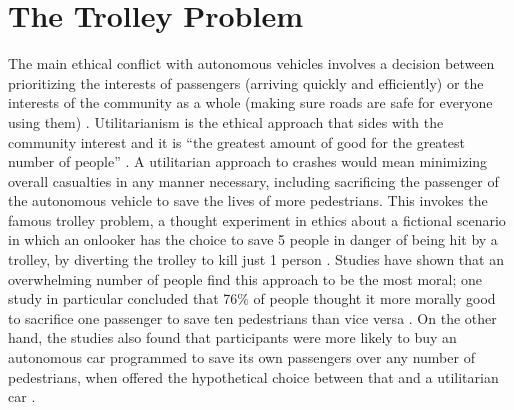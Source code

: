 \documentclass[10pt,twocolumn]{article}
\begin{document}
\section{The Trolley Problem}
The main ethical conflict with autonomous vehicles involves a decision between prioritizing the interests of passengers (arriving quickly and efficiently) or the interests of the community as a whole (making sure roads are safe for everyone using them)  \cite{AutonomousAccidents}. Utilitarianism is the ethical approach that sides with the community interest and it is “the greatest amount of good for the greatest number of people”  \cite{AutonomousAccidents}. A utilitarian approach to crashes would mean minimizing overall casualties in any manner necessary, including sacrificing the passenger of the autonomous vehicle to save the lives of more pedestrians. This invokes the famous trolley problem, a thought experiment in ethics about a fictional scenario in which an onlooker has the choice to save 5 people in danger of being hit by a trolley, by diverting the trolley to kill just 1 person \cite{TrolleyProblem}.  Studies have shown that an overwhelming number of people find this approach to be the most moral; one study in particular concluded that 76\% of people thought it more morally good to sacrifice one passenger to save ten pedestrians than vice versa  \cite{AutonomousAccidents}. On the other hand, the studies also found that participants were more likely to buy an autonomous car programmed to save its own passengers over any number of pedestrians, when offered the hypothetical choice between that and a utilitarian car  \cite{AutonomousAccidents}.
\end{document}
